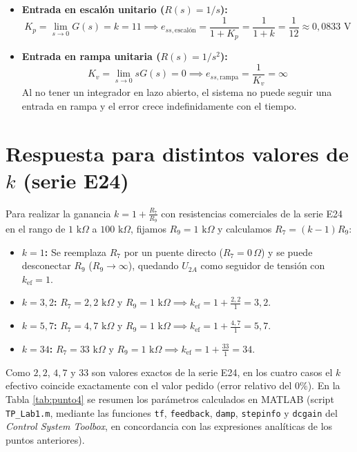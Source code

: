 \documentclass[11pt,a4paper]{article}
\begin{document}
\begin{itemize}
    \item \textbf{Entrada en escalón unitario ($R(s) = 1/s$):}
    \begin{equation}
        K_p = \lim_{s \to 0} G(s) = k = 11 \implies e_{ss,\text{escalón}} = \frac{1}{1 + K_p} = \frac{1}{1 + k} = \frac{1}{12} \approx 0,0833\text{ V}
    \end{equation}
    \item \textbf{Entrada en rampa unitaria ($R(s) = 1/s^2$):}
    \begin{equation}
        K_v = \lim_{s \to 0} s G(s) = 0 \implies e_{ss,\text{rampa}} = \frac{1}{K_v} = \infty
    \end{equation}
    Al no tener un integrador en lazo abierto, el sistema no puede seguir una entrada en rampa y el error crece indefinidamente con el tiempo.
\end{itemize}

\section{Respuesta para distintos valores de $k$ (serie E24)}
Para realizar la ganancia $k = 1 + \frac{R_7}{R_9}$ con resistencias comerciales de la serie E24 en el rango de $1\text{ k}\Omega$ a $100\text{ k}\Omega$, fijamos $R_9 = 1\text{ k}\Omega$ y calculamos $R_7 = (k - 1)R_9$:
\begin{itemize}
    \item \textbf{$k = 1$:} Se reemplaza $R_7$ por un puente directo ($R_7 = 0\,\Omega$) y se puede desconectar $R_9$ ($R_9 \to \infty$), quedando $U_{2A}$ como seguidor de tensión con $k_{\text{ef}} = 1$.
    \item \textbf{$k = 3,2$:} $R_7 = 2,2\text{ k}\Omega$ y $R_9 = 1\text{ k}\Omega \implies k_{\text{ef}} = 1 + \frac{2,2}{1} = 3,2$.
    \item \textbf{$k = 5,7$:} $R_7 = 4,7\text{ k}\Omega$ y $R_9 = 1\text{ k}\Omega \implies k_{\text{ef}} = 1 + \frac{4,7}{1} = 5,7$.
    \item \textbf{$k = 34$:} $R_7 = 33\text{ k}\Omega$ y $R_9 = 1\text{ k}\Omega \implies k_{\text{ef}} = 1 + \frac{33}{1} = 34$.
\end{itemize}
Como $2,2$, $4,7$ y $33$ son valores exactos de la serie E24, en los cuatro casos el $k$ efectivo coincide exactamente con el valor pedido (error relativo del $0\%$). En la Tabla \ref{tab:punto4} se resumen los parámetros calculados en MATLAB (script \texttt{TP\_Lab1.m}, mediante las funciones \texttt{tf}, \texttt{feedback}, \texttt{damp}, \texttt{stepinfo} y \texttt{dcgain} del \textit{Control System Toolbox}, en concordancia con las expresiones analíticas de los puntos anteriores).
\end{document}
